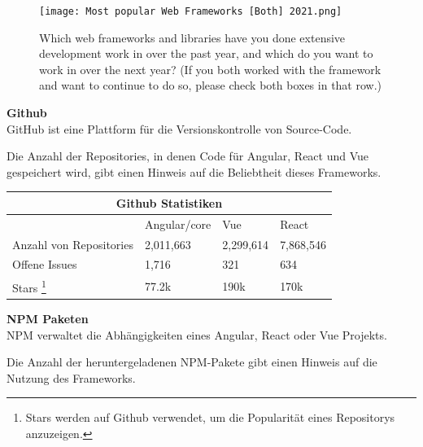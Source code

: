 \begin{figure}
  \centering
  \texttt{[image: Most popular Web Frameworks [Both] 2021.png]}
  \caption{ Which web frameworks and libraries have you done extensive development work in over the past year, and which do you want to work in over the next year? (If you both worked with the framework and want to continue to do so, please check both boxes in that row.) {\cite{SO01}}}

\end{figure}

\newpage
\begin{flushleft}
  \textbf{Github}\\
  GitHub ist eine Plattform für die Versionskontrolle von Source-Code. 
\end{flushleft}

Die Anzahl der Repositories, in denen Code für Angular, React und Vue gespeichert wird, gibt einen Hinweis auf die Beliebtheit dieses Frameworks.
\\
\begin{table}[h!]
  \centering
  \begin{tabular}{ |p{3cm}||p{3cm}|p{3.6cm}|p{3.6cm}|  }
    \hline
    \multicolumn{4}{|c|}{Github Statistiken}                        \\
    \hline
                            & Angular/core & Vue       & React     \\
    \hline
    Anzahl von     Repositories & 2,011,663     & 2,299,614 & 7,868,546
    \\
    \hline
    Offene Issues           & 1,716         & 321       & 634
    \\
    \hline
    Stars   \footnote{Stars werden auf Github verwendet, um die Popularität eines Repositorys anzuzeigen.}                 & 77.2k         & 190k      & 170k
    \\
    \hline
  \end{tabular}
\end{table}

{\cite{GH01, GH02, GH03}}


\textbf{NPM Paketen}\\
NPM verwaltet die Abhängigkeiten eines Angular, React oder Vue Projekts.

Die Anzahl der heruntergeladenen NPM-Pakete gibt einen Hinweis auf die Nutzung des Frameworks.

